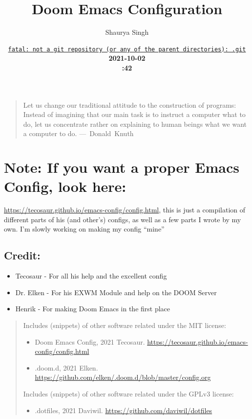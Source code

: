 \documentclass{scrartcl}
\author{Shaurya Singh}
\date{\href{https://github.com/shaunsingh/vimrc-dotfiles/commit/fatal: not a git repository (or any of the parent directories): .git}{\normalsize\texttt{fatal: not a git repository (or any of the parent directories): .git}}\\\Large\bfseries 2021-10-02 \\\normalsize\mdseries15:42 \acr{\lowercase{EDT}}}
\title{Doom Emacs Configuration}
\begin{document}
\maketitle
\tableofcontents

\begin{quote}
Let us change our traditional attitude to the construction of programs:
Instead of imagining that our main task is to instruct a computer what to do,
let us concentrate rather on explaining to human beings what we want a
computer to do. \mbox{--- Donald Knuth}
\end{quote}

\section{\textbf{Note:} If you want a proper Emacs Config, look here:}
\label{sec:orge1b4ce9}
\url{https://tecosaur.github.io/emacs-config/config.html}, this is just a compilation
of different parts of his (and other's) configs, as well as a few parts I wrote
by my own. I'm slowly working on making my config ``mine''

\subsection{Credit:}
\label{sec:orga1333e0}
\begin{itemize}
\item Tecosaur - For all his help and the excellent config
\item Dr. Elken - For his EXWM Module and help on the DOOM Server
\item Henrik - For making Doom Emacs in the first place
\end{itemize}

\begin{quote}
Includes (snippets) of other software related under the MIT license:
\begin{itemize}
\item Doom Emacs Config, 2021 Tecosaur. \url{https://tecosaur.github.io/emacs-config/config.html}
\item .doom.d, 2021 Elken. \url{https://github.com/elken/.doom.d/blob/master/config.org}
\end{itemize}

Includes (snippets) of other software related under the GPLv3 license:
\begin{itemize}
\item .dotfiles, 2021 Daviwil. \url{https://github.com/daviwil/dotfiles}
\end{itemize}
\end{quote}
\end{document}

